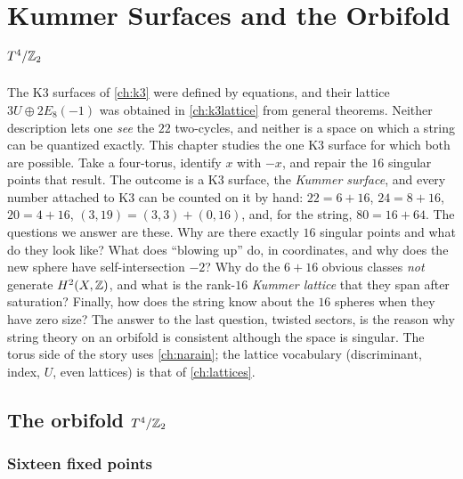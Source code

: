 \chapter{Kummer Surfaces and the Orbifold \texorpdfstring{$T^4/\mathbb{Z}_2$}{T4/Z2}}\label{ch:kummer}

The K3 surfaces of \cref{ch:k3} were defined by equations, and their lattice
$3U\oplus2E_8(-1)$ was obtained in \cref{ch:k3lattice} from general theorems. Neither
description lets one \emph{see} the $22$ two-cycles, and neither is a space on which a string
can be quantized exactly. This chapter studies the one K3 surface for which both are possible.
Take a four-torus, identify $x$ with $-x$, and repair the $16$ singular points that result. The
outcome is a K3 surface, the \emph{Kummer surface}, and every number
attached to K3 can be counted on it by hand: $22=6+16$, $24=8+16$, $20=4+16$,
$(3,19)=(3,3)+(0,16)$, and, for the string, $80=16+64$. The questions we answer are these. Why
are there exactly $16$ singular points and what do they look like? What does ``blowing up''
do, in coordinates, and why does the new sphere have self-intersection $-2$? Why do the $6+16$
obvious classes \emph{not} generate $H^2(X,\mathbb{Z})$, and what is the rank-$16$ \emph{Kummer
lattice} that they span after saturation? Finally, how does the string know about the $16$
spheres when they have zero size? The answer to the last question, twisted sectors, is the
reason why string theory on an orbifold is consistent although the space is singular. The
torus side of the story uses \cref{ch:narain}; the lattice vocabulary (discriminant, index,
$U$, even lattices) is that of \cref{ch:lattices}.

\section{The orbifold \texorpdfstring{$T^4/\mathbb{Z}_2$}{T4/Z2}}\label{sec:kummer:orbifold}

\subsection{Sixteen fixed points}

